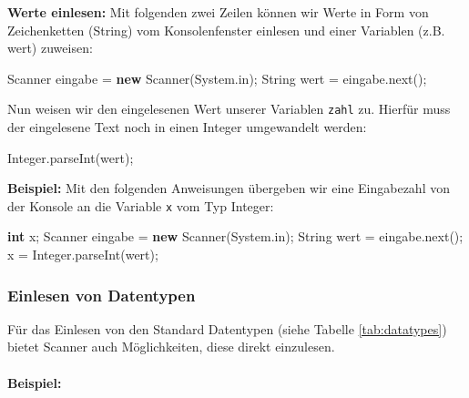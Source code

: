 \documentclass[10pt,paper=17cm:22cm, twoside=true, DIV=14]{scrbook}
\newenvironment {Shaded}
        {\begin{mdframed}[style=code] }
         {\end{mdframed}}
\newcommand{\KeywordTok}[1]{\textcolor[rgb]{0.1,0.1,0.1}{\textbf{#1}}}
\newcommand{\DataTypeTok}[1]{\textcolor[rgb]{0.1,0.1,0.1}{\textbf{#1}}}
\newcommand{\FunctionTok}[1]{\textcolor[rgb]{0.2,0.2,0.2}{#1}}
\newcommand{\NormalTok}[1]{#1}
\begin{document}
\textbf{Werte einlesen:} Mit folgenden zwei Zeilen können wir Werte in
Form von Zeichenketten (String) vom Konsolenfenster einlesen und einer
Variablen (z.B. wert) zuweisen:

\begin{Shaded}
\begin{Highlighting}[]
\NormalTok{Scanner eingabe = }\KeywordTok{new} \NormalTok{Scanner(System.}\FunctionTok{in}\NormalTok{);}
\NormalTok{String wert = eingabe.}\FunctionTok{next}\NormalTok{();}
\end{Highlighting}
\end{Shaded}

Nun weisen wir den eingelesenen Wert unserer Variablen \texttt{zahl} zu.
Hierfür muss der eingelesene Text noch in einen Integer umgewandelt
werden:

\begin{Shaded}
\begin{Highlighting}[]
\NormalTok{Integer.}\FunctionTok{parseInt}\NormalTok{(wert);}
\end{Highlighting}
\end{Shaded}

\textbf{Beispiel:} Mit den folgenden Anweisungen übergeben wir eine
Eingabezahl von der Konsole an die Variable \texttt{x} vom Typ Integer:

\begin{Shaded}
\begin{Highlighting}[]
\DataTypeTok{int} \NormalTok{x;}
\NormalTok{Scanner eingabe = }\KeywordTok{new} \NormalTok{Scanner(System.}\FunctionTok{in}\NormalTok{);}
\NormalTok{String wert = eingabe.}\FunctionTok{next}\NormalTok{();}
\NormalTok{x = Integer.}\FunctionTok{parseInt}\NormalTok{(wert);}
\end{Highlighting}
\end{Shaded}

\subsubsection{Einlesen von Datentypen}\label{einlesen-von-datentypen}

Für das Einlesen von den Standard Datentypen (siehe Tabelle
\ref{tab:datatypes}) bietet Scanner auch Möglichkeiten, diese direkt
einzulesen.

\paragraph{Beispiel:}\label{beispiel-9}
\end{document}
